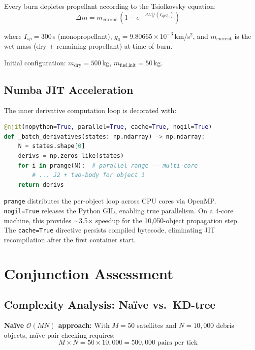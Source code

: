 \documentclass[12pt,a4paper]{article}
\begin{document}
Every burn depletes propellant according to the Tsiolkovsky equation:
\begin{equation}
\Delta m = m_{\text{current}} \left(1 - e^{-|\Delta V| / (I_{sp} g_0)}\right)
\end{equation}

where $I_{sp} = 300$\,s (monopropellant), $g_0 = 9.80665 \times 10^{-3}$\,km/s$^2$, and $m_{\text{current}}$ is the wet mass (dry + remaining propellant) at time of burn.

Initial configuration: $m_{\text{dry}} = 500$\,kg, $m_{\text{fuel,init}} = 50$\,kg.

\subsection{Numba JIT Acceleration}

The inner derivative computation loop is decorated with:
\begin{lstlisting}[language=Python, caption={Numba JIT decoration}]
@njit(nopython=True, parallel=True, cache=True, nogil=True)
def _batch_derivatives(states: np.ndarray) -> np.ndarray:
    N = states.shape[0]
    derivs = np.zeros_like(states)
    for i in prange(N):  # parallel range -- multi-core
        # ... J2 + two-body for object i
    return derivs
\end{lstlisting}

\texttt{prange} distributes the per-object loop across CPU cores via OpenMP. \texttt{nogil=True} releases the Python GIL, enabling true parallelism. On a 4-core machine, this provides $\sim$3.5$\times$ speedup for the 10,050-object propagation step. The \texttt{cache=True} directive persists compiled bytecode, eliminating JIT recompilation after the first container start.

\section{Conjunction Assessment}

\subsection{Complexity Analysis: Na\"{i}ve vs.\ KD-tree}

\textbf{Na\"{i}ve $\mathcal{O}(MN)$ approach:} With $M = 50$ satellites and $N = 10{,}000$ debris objects, na\"{i}ve pair-checking requires:
\begin{equation}
M \times N = 50 \times 10{,}000 = 500{,}000 \text{ pairs per tick}
\end{equation}
\end{document}
